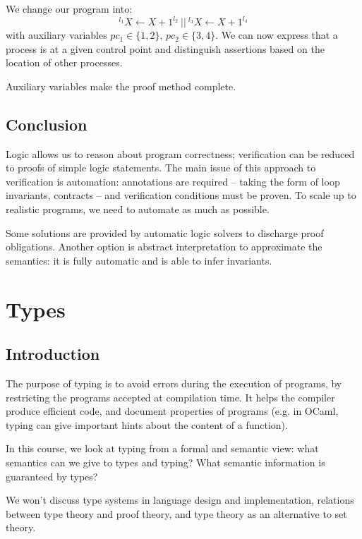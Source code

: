\documentclass[toc, titlepaged]{../cs-classes/cs-classes}
\begin{document}
\begin{example}
    We change our program into:
    \begin{equation*}
        {}^{l_1}X\leftarrow X+1^{l_2} \:||\: {}^{l_3}X\leftarrow X+1^{l_4}
    \end{equation*}
    with auxiliary variables $pc_1\in\{1, 2\}$, $pc_2\in\{3, 4\}$. We can now express that a process is at a given control point and distinguish assertions based on the location of other processes.
\end{example}

Auxiliary variables make the proof method complete.

\subsection*{Conclusion}
Logic allows us to reason about program correctness; verification can be reduced to proofs of simple logic statements. The main issue of this approach to verification is automation: annotations are required -- taking the form of loop invariants, contracts -- and verification conditions must be proven. To scale up to realistic programs, we need to automate as much as possible. 

Some solutions are provided by automatic logic solvers to discharge proof obligations. Another option is abstract interpretation to approximate the semantics: it is fully automatic and is able to infer invariants.


\section{Types}
\subsection{Introduction}
The purpose of typing is to avoid errors during the execution of programs, by restricting the programs accepted at compilation time. It helps the compiler produce efficient code, and document properties of programs (e.g. in OCaml, typing can give important hints about the content of a function).

In this course, we look at typing from a formal and semantic view: what semantics can we give to types and typing? What semantic information is guaranteed by types?

We won't discuss type systems in language design and implementation, relations between type theory and proof theory, and type theory as an alternative to set theory.
\end{document}
